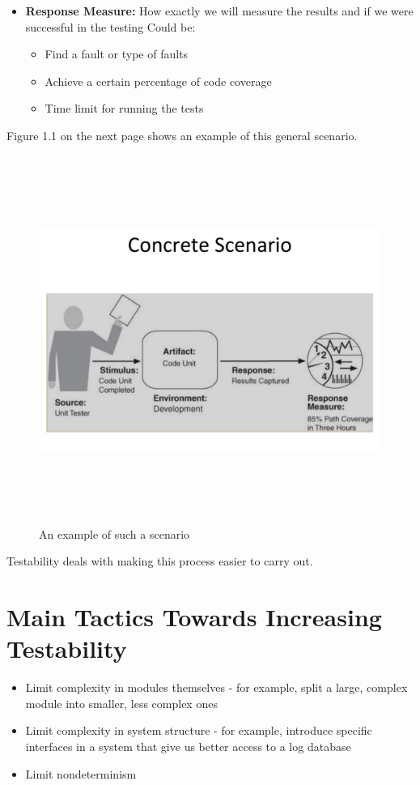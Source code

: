 \documentclass{report}
\begin{document}
\begin{itemize}
\item 
   \textbf{Response Measure:}
   How exactly we will measure the results and if we were successful in the testing
   Could be:
   \begin{itemize}
   \item Find a fault or type of faults
   \item Achieve a certain percentage of code coverage
   \item Time limit for running the tests
   \end{itemize} 
\end{itemize}

Figure 1.1 on the next page shows an example of this general scenario.
\begin{figure}[h]
\begin{center} 
    \includegraphics[scale=0.8,width = 15cm, height = 12cm]{images/n05at-zq1xe.pdf}
    \caption{An example of such a scenario}
\end{center}
\end{figure}

Testability deals with making this process easier to carry out.

\section{Main Tactics Towards Increasing Testability}
\begin{itemize}
\item Limit complexity in modules themselves - for example, split a large, complex module into smaller, less complex ones
\item Limit complexity in system structure - for example, introduce specific interfaces in a system that give us better access to a log database 
\item Limit nondeterminism
\end{itemize}
\end{document}
